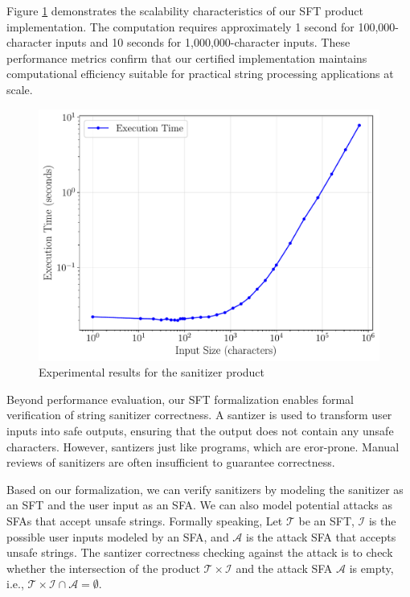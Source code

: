 Figure \ref{fig:benchmark-results} demonstrates the scalability characteristics of our SFT product implementation. The computation requires approximately 1 second for 100,000-character inputs and 10 seconds for 1,000,000-character inputs. These performance metrics confirm that our certified implementation maintains computational efficiency suitable for practical string processing applications at scale.

\begin{figure}
\centering
\includegraphics[scale=0.45]{benchmark_loglog.pdf}
\caption{Experimental results for the sanitizer product}
\label{fig:benchmark-results}
\end{figure}

Beyond performance evaluation, our SFT formalization enables formal verification of string sanitizer correctness. A santizer is used to transform user inputs into safe outputs, ensuring that the output does not contain any unsafe characters. However, santizers just like programs, which are eror-prone. Manual reviews of sanitizers are often insufficient to guarantee correctness.

Based on our formalization, we can verify sanitizers by modeling the sanitizer as an SFT and the user input as an SFA. We can also model potential attacks as SFAs that accept unsafe strings. Formally speaking, Let $\mathcal{T}$ be an SFT, $\mathcal{I}$ is the possible user inputs modeled by an SFA, and $\mathcal{A}$ is the attack SFA that accepts unsafe strings. The santizer correctness checking against the attack is to check whether the intersection of the product $\mathcal{T} \times \mathcal{I}$ and the attack SFA $\mathcal{A}$ is empty, i.e., $\mathcal{T} \times \mathcal{I} \cap \mathcal{A} = \emptyset$.

